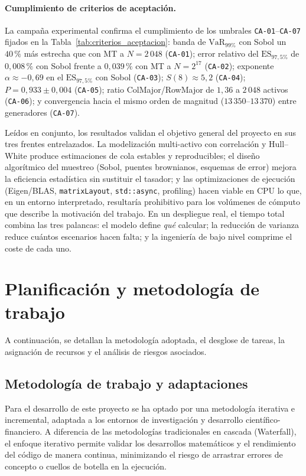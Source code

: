 \documentclass[11pt]{article}
\begin{document}
\paragraph{Cumplimiento de criterios de aceptación.}
La campaña experimental confirma el cumplimiento de los umbrales \texttt{CA-01}--\texttt{CA-07} fijados en la Tabla~\ref{tab:criterios_aceptacion}: banda de $\text{VaR}_{99\%}$ con Sobol un $40\,\%$ más estrecha que con MT a $N=2\,048$ (\texttt{CA-01}); error relativo del $\text{ES}_{97{,}5\%}$ de $0{,}008\,\%$ con Sobol frente a $0{,}039\,\%$ con MT a $N=2^{17}$ (\texttt{CA-02}); exponente $\alpha \approx -0{,}69$ en el $\text{ES}_{97{,}5\%}$ con Sobol (\texttt{CA-03}); $S(8)\approx 5{,}2$ (\texttt{CA-04}); $P=0{,}933\pm 0{,}004$ (\texttt{CA-05}); ratio ColMajor/RowMajor de $1{,}36$ a $2\,048$ activos (\texttt{CA-06}); y convergencia hacia el mismo orden de magnitud ($13\,350$--$13\,370$) entre generadores (\texttt{CA-07}).

Leídos en conjunto, los resultados validan el objetivo general del proyecto en sus tres frentes entrelazados.
La modelización multi-activo con correlación y Hull--White produce estimaciones de cola estables y reproducibles; el diseño algorítmico del muestreo (Sobol, puentes brownianos, esquemas de error) mejora la eficiencia estadística sin sustituir el tasador; y las optimizaciones de ejecución (Eigen/BLAS, \texttt{matrixLayout}, \texttt{std::async}, profiling) hacen viable en CPU lo que, en un entorno interpretado, resultaría prohibitivo para los volúmenes de cómputo que describe la motivación del trabajo.
En un despliegue real, el tiempo total combina las tres palancas: el modelo define \emph{qué} calcular; la reducción de varianza reduce cuántos escenarios hacen falta; y la ingeniería de bajo nivel comprime el coste de cada uno.


\section{Planificación y metodología de trabajo}

A continuación, se detallan la metodología adoptada, el desglose de tareas, la asignación de recursos y el análisis de riesgos asociados.

\subsection{Metodología de trabajo y adaptaciones}

Para el desarrollo de este proyecto se ha optado por una metodología iterativa e incremental, adaptada a los entornos de investigación y desarrollo científico-financiero. A diferencia de las metodologías tradicionales en cascada (Waterfall), el enfoque iterativo permite validar los desarrollos matemáticos y el rendimiento del código de manera continua, minimizando el riesgo de arrastrar errores de concepto o cuellos de botella en la ejecución.
\end{document}
